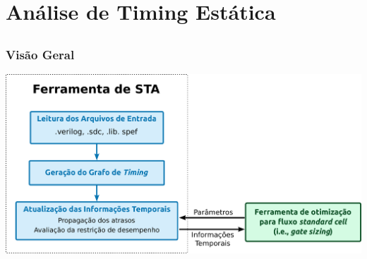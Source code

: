 \documentclass[10pt,a4paper]{beamer}
\begin{document}
	\section{Análise de Timing Estática}
	
		\subsection*{}
		\begin{frame}
			\frametitle{Visão Geral}
			\begin{center}
				\includegraphics[width=\linewidth]{img/fluxograma_sta.pdf}
			\end{center}
		\end{frame}
		
\end{document}
